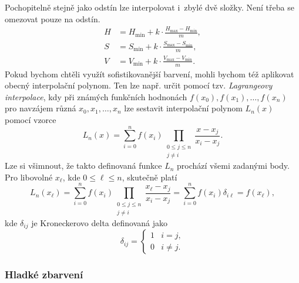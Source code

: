 Pochopitelně stejně jako odstín lze interpolovat i~zbylé dvě složky. Není třeba se omezovat pouze na odstín.
\begin{align*}
    H&=H_{\text{min}}+k\cdot\frac{H_{\text{max}}-H_{\text{min}}}{m},\\
    S&=S_{\text{min}}+k\cdot\frac{S_{\text{max}}-S_{\text{min}}}{m},\\
    V&=V_{\text{min}}+k\cdot\frac{V_{\text{max}}-V_{\text{min}}}{m}.
\end{align*}
Pokud bychom chtěli využít sofistikovanější barvení, mohli bychom též aplikovat obecný interpolační polynom. Ten lze např. určit pomocí tzv. \emph{Lagrangeovy interpolace}, kdy při známých funkčních hodnonách $f(x_0),f(x_1),\ldots,f(x_n)$ pro navzájem různá $x_0,x_1,\ldots,x_n$ lze sestavit interpolační polynom $L_n(x)$ pomocí vzorce
\[L_n(x)=\sum_{i=0}^{n}f(x_i)\prod_{\substack{0\leqslant j\leqslant n\\j\neq i}}{\frac {x-x_{j}}{x_{i}-x_{j}}}.\]
Lze si všimnout, že takto definovaná funkce $L_n$ prochází všemi zadanými body. Pro libovolné $x_\ell$, kde $0\leqslant\ell\leqslant n$, skutečně platí
\[L_n(x_\ell)=\sum_{i=0}^{n}f(x_i)\prod_{\substack{0\leqslant j\leqslant n\\j\neq i}}{\frac {x_\ell-x_{j}}{x_{i}-x_{j}}}=\sum_{i=0}^{n}f(x_i)\delta_{i\ell}=f(x_\ell),\]
kde $\delta_{ij}$ je Kroneckerovo delta definovaná jako
\[\delta_{ij}=\begin{cases}
    1 & i=j,\\
    0 & i\neq j.
\end{cases}\]

\subsubsection{Hladké zbarvení}


